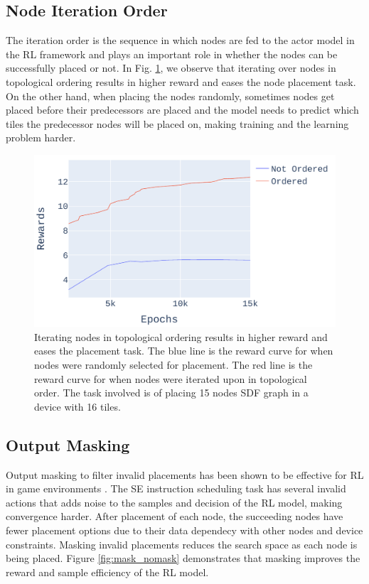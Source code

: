 \subsection{Node Iteration Order}

The iteration order is the sequence in which nodes are fed to the actor model in the RL framework and plays an important role in whether the nodes can be successfully placed or not. 
In Fig. \ref{fig:ordered_placement}, we observe that iterating over nodes in topological 
ordering results in higher reward and eases the node placement task. 
On the other hand, when placing the nodes randomly, sometimes nodes get placed before their predecessors are placed and the model needs to predict which tiles the predecessor nodes will be placed on, making training and the learning problem harder.

\begin{figure}[h]
  \centering
  \includegraphics[width=\linewidth]{fig/plot_ordered.pdf}
  \caption{Iterating nodes in topological ordering results in higher reward and eases the placement task. 
 The blue line is the reward curve for when nodes were randomly selected for placement. The red line is the reward curve for when nodes were iterated upon in topological order. The task involved is of placing 15 nodes SDF graph in a device with 16 tiles.}
  \label{fig:ordered_placement}
\end{figure}


\subsection{Output Masking}
\label{subsec:output_masking}
Output masking to filter invalid placements has been shown to be effective for RL in game environments \cite{Shengyi_mask}. 
The SE instruction scheduling task has several invalid actions that adds noise to the samples and decision of the RL model, making convergence harder. 
After placement of each node, the succeeding nodes have fewer placement options due to their data dependecy with other nodes and device constraints.
Masking invalid placements reduces the search space as each node is being placed. 
Figure \ref{fig:mask_nomask} demonstrates that masking improves the reward and sample efficiency of the RL model.

